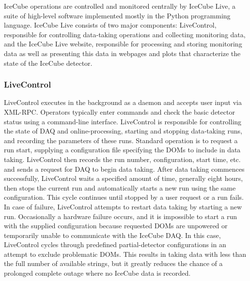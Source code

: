 IceCube operations are controlled and monitored centrally by
IceCube Live, a suite of high-level software implemented mostly in the
Python programming language.
IceCube Live consists of two major components: LiveControl, responsible for controlling data-taking operations and
collecting monitoring data, and the IceCube Live website, responsible for processing and storing monitoring data as well as presenting this data
in webpages and plots that characterize the state of the IceCube detector.

\subsubsection{LiveControl}

LiveControl executes in the background as a daemon and accepts user input via XML-RPC.
Operators typically enter commands and check the basic detector status using a command-line interface.  LiveControl is
responsible for controlling the state of DAQ and online-processing, starting and stopping data-taking runs, and recording
the parameters of these runs.  Standard operation is to request a run start, supplying a configuration file specifying the DOMs to include in
data taking.  LiveControl then records the run number, configuration, start time, etc. and sends a request for DAQ to
begin data taking.  After data taking commences successfully, LiveControl waits a specified amount of time, generally eight
hours, then stops the current run and automatically starts a new run using the same configuration.  This cycle continues until
stopped by a user request or a run fails.  In case of failure, LiveControl attempts to restart data taking by starting a new
run.  Occasionally a hardware failure occurs, and it is impossible to start a run with the supplied configuration because requested DOMs are
unpowered or temporarily unable to communicate with the IceCube DAQ.  In this case, LiveControl cycles through predefined partial-detector
configurations in an attempt to exclude problematic DOMs.  This
results in taking data with less than the full number of available strings, but it
greatly reduces the chance of a prolonged complete outage where no IceCube data is recorded.

